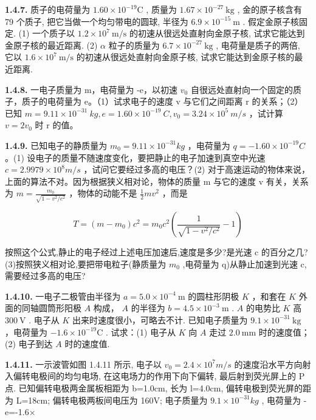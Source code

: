 \newpage
\textbf{1.4.7.} 质子的电荷量为 $1.60 \times 10^{-19} \mathrm{C}$ , 质量为 $1.67 \times 10^{-27} \mathrm{~kg}$ , 金的原子核含有 79 个质子, 把它当做一个均匀带电的圆球, 半径为 $6.9 \times 10^{-15} \mathrm{~m}$ . 假定金原子核固定. (1) 一个质子以 $1.2 \times 10^{7} \mathrm{~m} / \mathrm{s}$ 的初速从很远处直射向金原子核, 试求它能达到金原子核的最近距离. (2) $\alpha$ 粒子的质量为 $6.7 \times 10^{-27} \mathrm{~kg}$ , 电荷量是质子的两倍, 它以 $1.6 \times 10^{7} \mathrm{~m} / \mathrm{s}$ 的初速从很远处直射向金原子核, 试求它能达到金原子核的最近距离.

\vfill

\textbf{1.4.8.} 一电子质量为 m，电荷量为 -e，以初速 $v_{0}$ 自很远处直射向一个固定的质子，质子的电荷量为 e。（1）试求电子的速度 v 与它们之间距离 r 的关系；（2）已知 $m = 9.11 \times 10^{-31} ~kg, e = 1.60 \times 10^{-19} ~C, v_{0} = 3.24 \times 10^{5} ~m/s$ ，试计算 $v = 2v_{0}$ 时 r 的值。

\vfill

\newpage
\textbf{1.4.9.} 已知电子的静质量为 $m_{0}=9.11\times10^{-31}kg$ ，电荷量为 $q=-1.60\times10^{-19}C$ 。(1) 设电子的质量不随速度变化，要把静止的电子加速到真空中光速 $c=2.9979\times10^{8}m/s$ ，试问它要经过多高的电压？(2) 对于高速运动的物体来说，上面的算法不对。因为根据狭义相对论，物体的质量 m 与它的速度 v 有关，关系为 $\displaystyle m=\frac{m_{0}}{\sqrt{1-v^{2}/c^{2}}}$ ，物体的动能不是 $\displaystyle \frac{1}{2}mv^{2}$ ，而是

$$
T = (m - m _ {0}) c ^ {2} = m _ {0} c ^ {2} \left(\frac {1}{\sqrt {1 - v ^ {2} / c ^ {2}}} - 1\right)
$$

按照这个公式,静止的电子经过上述电压加速后,速度是多少?是光速 c 的百分之几?(3)按照狭义相对论,要把带电粒子(静质量为 $m_{0}$ ,电荷量为 q)从静止加速到光速 c,需要经过多高的电压?

\vfill

\textbf{1.4.10.} 一电子二极管由半径为 $a = 5.0 \times 10^{-4} \mathrm{~m}$ 的圆柱形阴极 $K$ ，和套在 $K$ 外面的同轴圆筒形阳极 $A$ 构成， $A$ 的半径为 $b = 4.5 \times 10^{-3} \mathrm{~m}$ . $A$ 的电势比 $K$ 高 $300 \mathrm{~V}$ . 电子从 $K$ 出来时速度很小，可略去不计. 已知电子质量为 $9.1 \times 10^{-31} \mathrm{~kg}$ ，电荷量为 $-1.6 \times 10^{-19} \mathrm{C}$ . 试求：(1) 电子从 $K$ 向 $A$ 走过 $2.0 \mathrm{~mm}$ 时的速度值；(2) 电子到达 $A$ 时的速度值.

\vfill

\newpage
\textbf{1.4.11.} 一示波管如图 1.4.11 所示, 电子以 $v_{0}=2.4\times10^{7}m/s$ 的速度沿水平方向射入偏转电极间的均匀电场, 在这电场力的作用下向下偏转, 最后射到荧光屏上的 P 点. 已知偏转电极两金属板相距为 b=1.0cm, 长为 l=4.0cm, 偏转电极到荧光屏的距为 L=18cm; 偏转电极两板间电压为 160V; 电子质量为 $9.1\times10^{-31}kg$ , 电荷量为 -e=-1.6×



